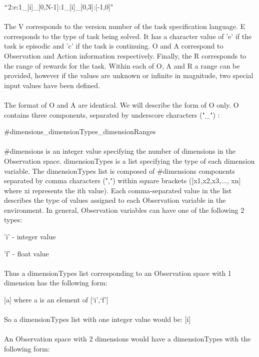 \documentclass[11pt]{article}
\begin{document}
\hspace{30 pt}$``$2:e:1\_[i]\_[0,N-1]:1\_[i]\_[0,3]:[-1,0]"\\\\
The V corresponds to the version number of the task specification language. E corresponds to the type of task being solved. It has a character value of 'e' if the task is episodic and 'c' if the task is continuing. O and A correspond to Observation and Action information respectively. Finally, the R corresponds to the range of rewards for the task. Within each of O, A and R a range can be provided, however if the values are unknown or infinite in magnitude, two special input values have been defined.
\\\\
The format of O and A are identical. We will describe the form of O only. O contains three components, separated by underscore characters ("\_") :
        
\hspace{30 pt} \#dimensions\_dimensionTypes\_dimensionRanges
\\\\
\#dimensions is an integer value specifying the number of dimensions in the Observation space. dimensionTypes is a list specifying the type of each dimension variable. The dimensionTypes list is composed of \#dimensions components separated by comma characters (",") within square brackets ([x1,x2,x3,..., xn] where xi  represents the ith value). Each comma-separated value in the list describes the type of values assigned to each Observation variable in the environment. In general, Observation variables can have one of the following 2 types:

\hspace{30 pt} 'i' - integer value

\hspace{30 pt} 'f' - float value
\\\\
Thus a dimensionTypes list corresponding to an Observation space with 1 dimension has the following form:

\hspace{30 pt}[a] where a is an element of [`i',`f']
\\\\
So a dimensionTypes list with one integer value would be:        
\hspace{30 pt} [i]
\\\\
An Observation space with 2 dimensions would have a dimensionTypes with the following form:
\end{document}
